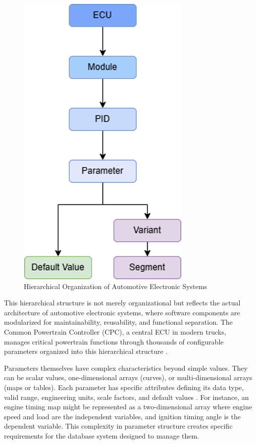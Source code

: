 \begin{figure}[ht]
    \centering
    \includegraphics[height=0.4\textheight]{figures/ecu_hierarchy.png}
    \caption{Hierarchical Organization of Automotive Electronic Systems}
    \label{fig:ecu-hierarchy}
\end{figure}

This hierarchical structure is not merely organizational but reflects the actual architecture of automotive electronic systems, where software components are modularized for maintainability, reusability, and functional separation. The Common Powertrain Controller (CPC), a central ECU in modern trucks, manages critical powertrain functions through thousands of configurable parameters organized into this hierarchical structure \cite{staron2021automotive}.

Parameters themselves have complex characteristics beyond simple values. They can be scalar values, one-dimensional arrays (curves), or multi-dimensional arrays (maps or tables). Each parameter has specific attributes defining its data type, valid range, engineering units, scale factors, and default values \cite{pretschner2007software}. For instance, an engine timing map might be represented as a two-dimensional array where engine speed and load are the independent variables, and ignition timing angle is the dependent variable. This complexity in parameter structure creates specific requirements for the database system designed to manage them.

